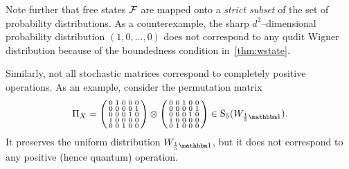 Note further that free states ${\mathcal F}$ are mapped onto a \emph{strict subset} of the set of probability distributions.
As a counterexample, the sharp $d^2$--dimensional probability distribution $(1, 0, \dots, 0)$ does not correspond to any qudit Wigner distribution because of the boundedness condition in~\cref{thm:wstate}.

Similarly, not all stochastic matrices correspond to completely positive operations.
As an example, consider the permutation matrix
\begin{equation}
    \Pi_X = \begin{psmallmatrix}
        0 & 1 & 0 & 0 & 0 \\
        0 & 0 & 0 & 0 & 1 \\
        0 & 0 & 0 & 1 & 0 \\
        1 & 0 & 0 & 0 & 0 \\
        0 & 0 & 1 & 0 & 0
    \end{psmallmatrix} \otimes \begin{psmallmatrix}
        0 & 0 & 1 & 0 & 0 \\
        0 & 0 & 0 & 0 & 1 \\
        0 & 0 & 0 & 1 & 0 \\
        1 & 0 & 0 & 0 & 0 \\
        0 & 1 & 0 & 0 & 0    
    \end{psmallmatrix} \in {\rm{S}}_5({\W{\frac{1}{5}\id}}).
\end{equation}
It preserves the uniform distribution $\W{\frac{1}{5}\id}$, but it does not correspond to any positive (hence quantum) operation.

